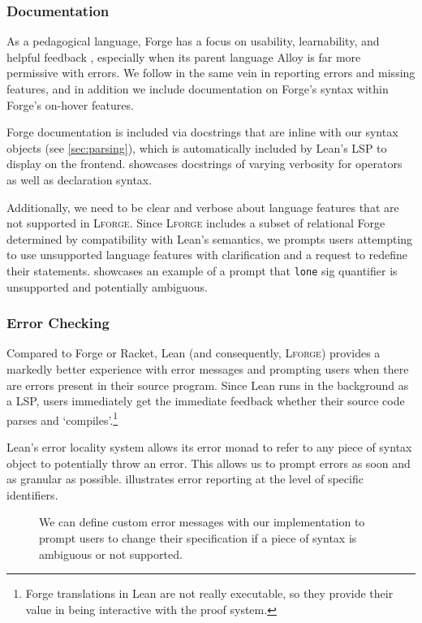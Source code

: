 \subsubsection{Documentation}

As a pedagogical language, Forge has a focus on usability, learnability, and helpful feedback \cite{ngpdbccdlrrvwwk-oopsla-2024}, especially when its parent language Alloy is far more permissive with errors. We follow in the same vein in reporting errors and missing features, and in addition we include documentation on Forge's syntax within Forge's on-hover features. 

Forge documentation is included via docstrings that are inline with our syntax objects (see \cref{sec:parsing}), which is automatically included by Lean's LSP to display on the frontend.  showcases docstrings of varying verbosity for operators as well as declaration syntax. 

Additionally, we need to be clear and verbose about language features that are not supported in \textsc{Lforge}. Since \textsc{Lforge} includes a subset of relational Forge determined by compatibility with Lean's semantics, we prompts users attempting to use unsupported language features with clarification and a request to redefine their statements.  showcases an example of a prompt that \texttt{lone} sig quantifier is unsupported and potentially ambiguous. 

\subsubsection{Error Checking}

Compared to Forge or Racket, Lean (and consequently, \textsc{Lforge}) provides a markedly better experience with error messages and prompting users when there are errors present in their source program. Since Lean runs in the background as a LSP, users immediately get the immediate feedback whether their source code parses and `compiles'.\footnote{Forge translations in Lean are not really executable, so they provide their value in being interactive with the proof system.}

Lean's error locality system allows its error monad to refer to any piece of syntax object to potentially throw an error. This allows us to prompt errors as soon and as granular as possible.  illustrates error reporting at the level of specific identifiers. 

\begin{figure}[h!]
  \centering
  \caption{We can define custom error messages with our implementation to prompt users to change their specification if a piece of syntax is ambiguous or not supported.}
  \label{fig:sc-unsupported}
\end{figure}

